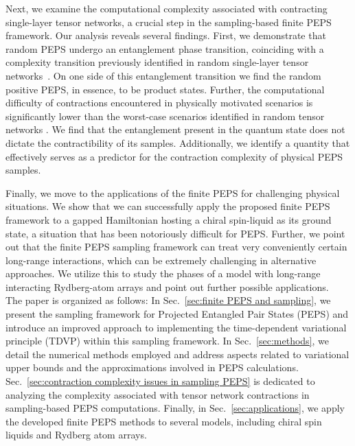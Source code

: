 \documentclass[aps,notitlepage,twocolumn,nofootinbib,superscriptaddress,pra,10pt]{revtex4-2}
\begin{document}
Next, we examine the computational complexity associated with contracting single-layer tensor networks, a crucial step in the sampling-based finite PEPS framework.
Our analysis reveals several findings.
First, we demonstrate that random PEPS undergo an entanglement phase transition, coinciding with a complexity transition previously identified in random single-layer tensor networks~\cite{chen2024signproblem}. On one side of this entanglement transition we find the random positive PEPS, in essence, to be product states.
Further, the computational difficulty of contractions encountered in physically motivated scenarios is significantly lower than the worst-case scenarios identified in random tensor networks \cite{chen2024signproblem}.
We find that the entanglement present in the quantum state does not dictate the contractibility of its samples. 
Additionally, we identify a quantity that effectively serves as a predictor for the contraction complexity of physical PEPS samples.

Finally, we move to the applications of the finite PEPS for challenging physical situations.
We show that we can successfully apply the proposed finite PEPS framework to a gapped Hamiltonian hosting a chiral spin-liquid as its ground state, a situation that has been notoriously difficult for PEPS.
Further, we point out that the finite PEPS sampling framework can treat very conveniently certain long-range interactions, which can be extremely challenging in alternative approaches. %
We utilize this to study the phases of a model with long-range interacting Rydberg-atom arrays and point out further possible applications.\\

The paper is organized as follows: 
In Sec.~\ref{sec:finite PEPS and sampling}, we present the sampling framework for Projected Entangled Pair States (PEPS) and introduce an improved approach to implementing the time-dependent variational principle (TDVP) within this sampling framework. 
In Sec.~\ref{sec:methods}, we detail the numerical methods employed and address aspects related to variational upper bounds and the approximations involved in PEPS calculations. 
Sec.~\ref{sec:contraction complexity issues in sampling PEPS} is dedicated to analyzing the complexity associated with tensor network contractions in sampling-based PEPS computations. 
Finally, in Sec.~\ref{sec:applications}, we apply the developed finite PEPS methods to several models, including chiral spin liquids and Rydberg atom arrays.
\end{document}
